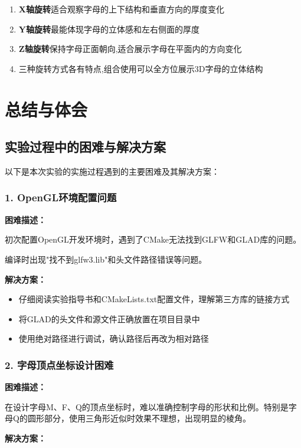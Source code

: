 \documentclass[a4paper]{article}
\begin{document}
\begin{enumerate}
    \item \textbf{X轴旋转}适合观察字母的上下结构和垂直方向的厚度变化
    \item \textbf{Y轴旋转}最能体现字母的立体感和左右侧面的厚度
    \item \textbf{Z轴旋转}保持字母正面朝向,适合展示字母在平面内的方向变化
    \item 三种旋转方式各有特点,组合使用可以全方位展示3D字母的立体结构
\end{enumerate}

\section{总结与体会}

\subsection{实验过程中的困难与解决方案}
以下是本次实验的实施过程遇到的主要困难及其解决方案：

\subsubsection{1. OpenGL环境配置问题}

\textbf{困难描述：}

初次配置OpenGL开发环境时，遇到了CMake无法找到GLFW和GLAD库的问题。

编译时出现"找不到glfw3.lib"和头文件路径错误等问题。

\textbf{解决方案：}

\begin{itemize}
    \item 仔细阅读实验指导书和CMakeLists.txt配置文件，理解第三方库的链接方式
    \item 将GLAD的头文件和源文件正确放置在项目目录中
    \item 使用绝对路径进行调试，确认路径后再改为相对路径
\end{itemize}


\subsubsection{2. 字母顶点坐标设计困难}

\textbf{困难描述：}

在设计字母M、F、Q的顶点坐标时，难以准确控制字母的形状和比例。特别是字母Q的圆形部分，使用三角形近似时效果不理想，出现明显的棱角。

\textbf{解决方案：}
\end{document}
